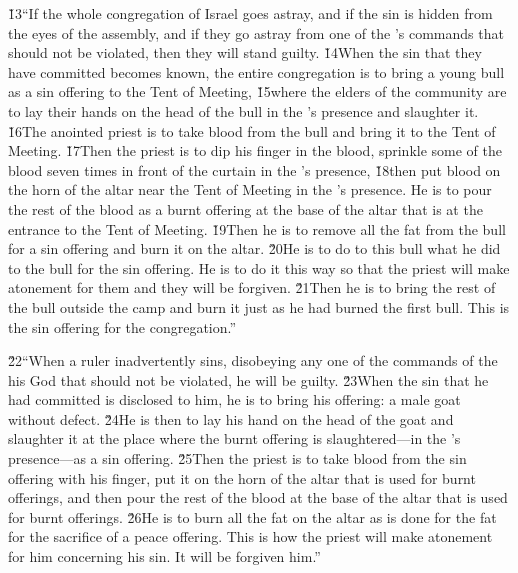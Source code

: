 \v{13}``If the whole congregation of Israel goes astray, and if the sin is hidden from the eyes of the assembly, and if they go astray from one of the 's commands that should not be violated, then they will stand guilty. \v{14}When the sin that they have committed becomes known, the entire congregation is to bring a young bull as a sin offering to the Tent of Meeting, \v{15}where the elders of the community are to lay their hands on the head of the bull in the 's presence and slaughter it. \v{16}The anointed priest is to take blood from the bull and bring it to the Tent of Meeting. \v{17}Then the priest is to dip his finger in the blood, sprinkle some of the blood seven times in front of the curtain in the 's presence, \v{18}then put blood on the horn of the altar near the Tent of Meeting in the 's presence. He is to pour the rest of the blood as a burnt offering at the base of the altar that is at the entrance to the Tent of Meeting. \v{19}Then he is to remove all the fat from the bull for a sin offering and burn it on the altar. \v{20}He is to do to this bull what he did to the bull for the sin offering. He is to do it this way so that the priest will make atonement for them and they will be forgiven. \v{21}Then he is to bring the rest of the bull outside the camp and burn it just as he had burned the first bull. This is the sin offering for the congregation.''

\v{22}``When a ruler inadvertently sins, disobeying any one of the commands of the  his God that should not be violated, he will be guilty. \v{23}When the sin that he had committed is disclosed to him, he is to bring his offering: a male goat without defect. \v{24}He is then to lay his hand on the head of the goat and slaughter it at the place where the burnt offering is slaughtered---in the 's presence---as a sin offering. \v{25}Then the priest is to take blood from the sin offering with his finger, put it on the horn of the altar that is used for burnt offerings, and then pour the rest of the blood at the base of the altar that is used for burnt offerings. \v{26}He is to burn all the fat on the altar as is done for the fat for the sacrifice of a peace offering. This is how the priest will make atonement for him concerning his sin. It will be forgiven him.''

